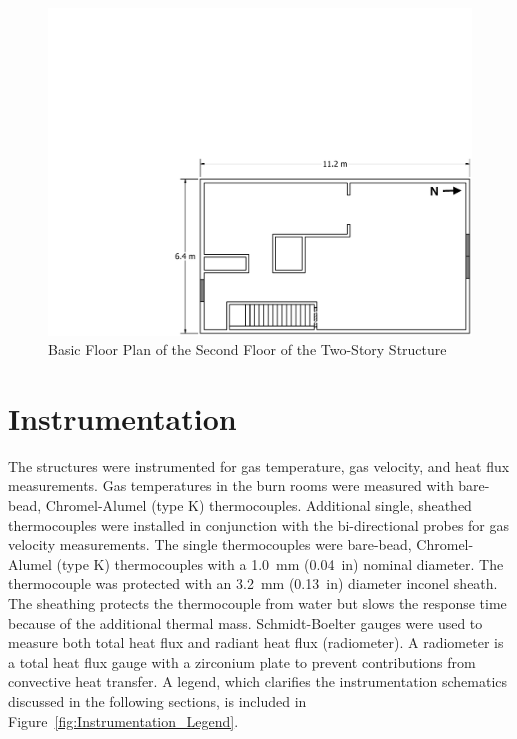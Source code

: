 \documentclass[12pt,oneside]{book}
\begin{document}
\begin{figure}[!ht]
	\includegraphics[width=\columnwidth]{../../DelCo_2014_2015/Drawings/PDFs/CAFS/West_Structure_2nd_Floor_Plain}
	\caption{Basic Floor Plan of the Second Floor of the Two-Story Structure}
	\label{fig:dimensioned_second_2story}
\end{figure}

\clearpage

\section{Instrumentation}
\label{sec:Instrumentation}

The structures were instrumented for gas temperature, gas velocity, and heat flux measurements. Gas temperatures in the burn rooms were measured with bare-bead, Chromel-Alumel (type K) thermocouples. Additional single, sheathed thermocouples were installed in conjunction with the bi-directional probes for gas velocity measurements. The single thermocouples were bare-bead, Chromel-Alumel (type K) thermocouples with a 1.0~mm (0.04~in) nominal diameter. The thermocouple was protected with an 3.2~mm (0.13~in) diameter inconel sheath. The sheathing protects the thermocouple from water but slows the response time because of the additional thermal mass. Schmidt-Boelter gauges were used to measure both total heat flux and radiant heat flux (radiometer). A radiometer is a total heat flux gauge with a zirconium plate to prevent contributions from convective heat transfer. A legend, which clarifies the instrumentation schematics discussed in the following sections, is included in Figure~\ref{fig:Instrumentation_Legend}.
\end{document}
